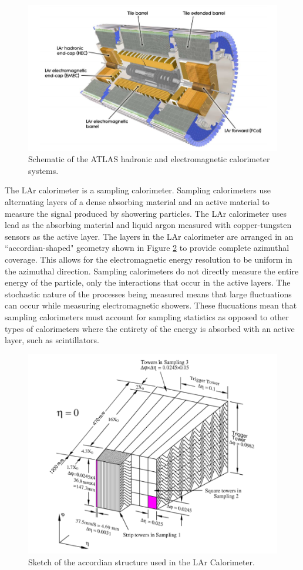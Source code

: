 \begin{figure}[ht!]
	\centering
	\includegraphics[width=\columnwidth]{../ThesisImages/LHCImages/ATLASCaloSystem.png}
	\caption[Schematic of the ATLAS hadronic and electromagnetic calorimeter systems.]{Schematic of the ATLAS hadronic and electromagnetic calorimeter systems\cite{ATLAS}.
	}
	\label{fig:ATLASCaloSys}
\end{figure}

The LAr calorimeter is a sampling calorimeter.  Sampling calorimeters use alternating layers of a dense absorbing material and an active material to measure the signal produced by showering particles.  The LAr calorimeter uses lead as the absorbing material and liquid argon measured with copper-tungsten sensors as the active layer.  The layers in the LAr calorimeter are arranged in an ``accordian-shaped" geometry shown in Figure \ref{fig:LArAccordian} to provide complete azimuthal coverage.  This allows for the electromagnetic energy resolution to be uniform in the azimuthal direction.  Sampling calorimeters do not directly measure the entire energy of the particle, only the interactions that occur in the active layers. The stochastic nature of the processes being measured means that large fluctuations can occur while measuring electromagnetic showers.  These flucuations mean that sampling calorimeters must account for sampling statistics as opposed to other types of calorimeters where the entirety of the energy is absorbed with an active layer, such as scintillators.  
\begin{figure}[ht!]
	\centering
	\includegraphics[width=0.5\columnwidth]{../ThesisImages/LHCImages/LArAccordian.png}
	\caption[Sketch of the accordian structure used in the LAr Calorimeter.]{Sketch of the accordian structure used in the LAr Calorimeter\cite{CERN-LHCC-96-041}.
	}
	\label{fig:LArAccordian}
\end{figure}

